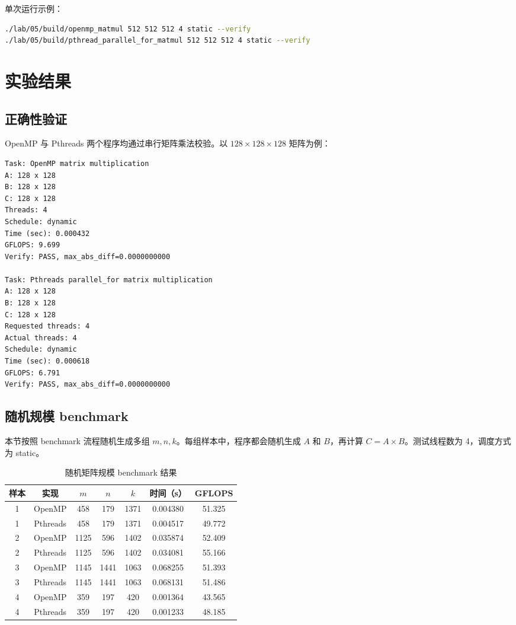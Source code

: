 \documentclass[12pt,a4paper]{ctexart}
\begin{document}
单次运行示例：
\begin{lstlisting}[language=bash]
./lab/05/build/openmp_matmul 512 512 512 4 static --verify
./lab/05/build/pthread_parallel_for_matmul 512 512 512 4 static --verify
\end{lstlisting}

\section{实验结果}

\subsection*{正确性验证}
OpenMP 与 Pthreads 两个程序均通过串行矩阵乘法校验。以 $128\times128\times128$ 矩阵为例：
\begin{lstlisting}
Task: OpenMP matrix multiplication
A: 128 x 128
B: 128 x 128
C: 128 x 128
Threads: 4
Schedule: dynamic
Time (sec): 0.000432
GFLOPS: 9.699
Verify: PASS, max_abs_diff=0.0000000000

Task: Pthreads parallel_for matrix multiplication
A: 128 x 128
B: 128 x 128
C: 128 x 128
Requested threads: 4
Actual threads: 4
Schedule: dynamic
Time (sec): 0.000618
GFLOPS: 6.791
Verify: PASS, max_abs_diff=0.0000000000
\end{lstlisting}

\subsection*{随机规模 benchmark}
本节按照 benchmark 流程随机生成多组 $m,n,k$。每组样本中，程序都会随机生成 $A$ 和 $B$，再计算 $C=A\times B$。测试线程数为 4，调度方式为 static。

\begin{table}[h]
\centering
\caption{随机矩阵规模 benchmark 结果}
\begin{tabular}{ccccccc}
\toprule
样本 & 实现 & $m$ & $n$ & $k$ & 时间（s） & GFLOPS \\
\midrule
1 & OpenMP & 458 & 179 & 1371 & 0.004380 & 51.325 \\
1 & Pthreads & 458 & 179 & 1371 & 0.004517 & 49.772 \\
2 & OpenMP & 1125 & 596 & 1402 & 0.035874 & 52.409 \\
2 & Pthreads & 1125 & 596 & 1402 & 0.034081 & 55.166 \\
3 & OpenMP & 1145 & 1441 & 1063 & 0.068255 & 51.393 \\
3 & Pthreads & 1145 & 1441 & 1063 & 0.068131 & 51.486 \\
4 & OpenMP & 359 & 197 & 420 & 0.001364 & 43.565 \\
4 & Pthreads & 359 & 197 & 420 & 0.001233 & 48.185 \\
\bottomrule
\end{tabular}
\end{table}
\end{document}

